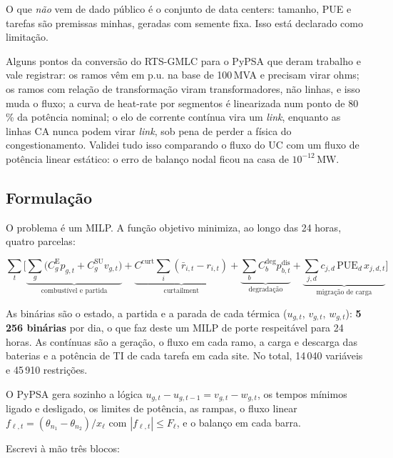 \documentclass[11pt,a4paper]{article}
\begin{document}
O que \emph{não} vem de dado público é o conjunto de data centers: tamanho, PUE e tarefas são premissas
minhas, geradas com semente fixa. Isso está declarado como limitação.

Alguns pontos da conversão do RTS-GMLC para o PyPSA que deram trabalho e vale registrar: os ramos vêm em
p.u. na base de 100\,MVA e precisam virar ohms; os ramos com relação de transformação viram
transformadores, não linhas, e isso muda o fluxo; a curva de heat-rate por segmentos é linearizada num
ponto de 80\,\% da potência nominal; o elo de corrente contínua vira um \emph{link}, enquanto as linhas CA
nunca podem virar \emph{link}, sob pena de perder a física do congestionamento. Validei tudo isso
comparando o fluxo do UC com um fluxo de potência linear estático: o erro de balanço nodal ficou na casa
de $10^{-12}$\,MW.

\subsection{Formulação}

O problema é um MILP. A função objetivo minimiza, ao longo das 24 horas, quatro parcelas:

\begin{equation}
\sum_{t}\Big[\underbrace{\sum_{g}\big(C^{\mathrm{E}}_g p_{g,t} + C^{\mathrm{SU}}_g v_{g,t}\big)}_{\text{combustível e partida}}
+ \underbrace{C^{\mathrm{curt}}\!\sum_{i}(\bar r_{i,t}-r_{i,t})}_{\text{curtailment}}
+ \underbrace{\sum_{b} C^{\mathrm{deg}}_b p^{\mathrm{dis}}_{b,t}}_{\text{degradação}}
+ \underbrace{\sum_{j,d} c_{j,d}\,\mathrm{PUE}_d\,x_{j,d,t}}_{\text{migração de carga}}\Big]
\end{equation}

As binárias são o estado, a partida e a parada de cada térmica ($u_{g,t}$, $v_{g,t}$, $w_{g,t}$):
\textbf{5\,256 binárias} por dia, o que faz deste um MILP de porte respeitável para 24 horas. As
contínuas são a geração, o fluxo em cada ramo, a carga e descarga das baterias e a potência de TI de cada
tarefa em cada site. No total, 14\,040 variáveis e 45\,910 restrições.

O PyPSA gera sozinho a lógica $u_{g,t}-u_{g,t-1}=v_{g,t}-w_{g,t}$, os tempos mínimos ligado e desligado,
os limites de potência, as rampas, o fluxo linear
$f_{\ell,t}=(\theta_{n_1}-\theta_{n_2})/x_\ell$ com $|f_{\ell,t}|\le F_\ell$, e o balanço em cada barra.

Escrevi à mão três blocos:
\end{document}
